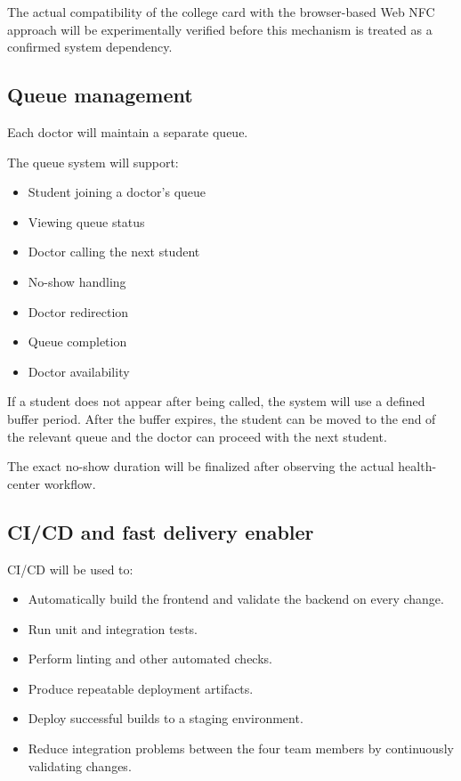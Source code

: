 \documentclass[11pt,a4paper]{article}
\begin{document}
The actual compatibility of the college card with the browser-based Web NFC approach will be experimentally verified before this mechanism is treated as a confirmed system dependency.

\subsection{Queue management}

Each doctor will maintain a separate queue.

The queue system will support:

\begin{itemize}

    \item Student joining a doctor's queue
    \item Viewing queue status
    \item Doctor calling the next student
    \item No-show handling
    \item Doctor redirection
    \item Queue completion
    \item Doctor availability

\end{itemize}

If a student does not appear after being called, the system will use a defined buffer period. After the buffer expires, the student can be moved to the end of the relevant queue and the doctor can proceed with the next student.

The exact no-show duration will be finalized after observing the actual health-center workflow.

\subsection{CI/CD and fast delivery enabler}

CI/CD will be used to:

\begin{itemize}

    \item Automatically build the frontend and validate the backend on every change.

    \item Run unit and integration tests.

    \item Perform linting and other automated checks.

    \item Produce repeatable deployment artifacts.

    \item Deploy successful builds to a staging environment.

    \item Reduce integration problems between the four team members by continuously validating changes.

\end{itemize}
\end{document}
